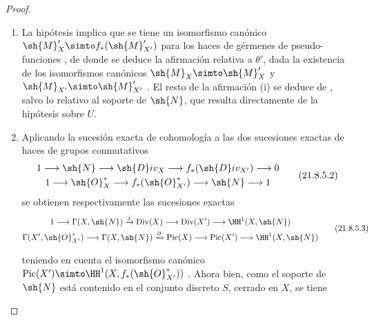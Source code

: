 \begin{proof}
\begin{enumerate}[label=(\roman*)]
  \item La hipótesis implica que se tiene un isomorfismo canónico $\sh{M}'_X\simto f_*(\sh{M}'_{X'})$ para los haces de gérmenes de pseudo-funciones , de donde se deduce la afirmación relativa a $\theta'$, dada la existencia de los isomorfismos canónicos $\sh{M}_X\simto\sh{M}'_X$ y $\sh{M}_{X'}\simto\sh{M}'_{X'}$ .
El resto de la afirmación (i) se deduce de , salvo lo relativo al soporte de $\sh{N}$, que resulta directamente de la hipótesis sobre $U$.

  \item Aplicando la sucesión exacta de cohomología a las dos sucesiones exactas de haces de grupos conmutativos
\[
\label{IV.21.8.5.2}
\begin{gathered}
  1\to\sh{N}\to\sh{D}iv_X\to f_*(\sh{D}iv_{X'})\to0\\
  1\to\sh{O}^*_X\to f_*(\sh{O}^*_{X'})\to\sh{N}\to1
\end{gathered}
  \tag{21.8.5.2}
\]
se obtienen respectivamente las sucesiones exactas
\[
\label{IV.21.8.5.3}
\begin{gathered}
  1\to\Gamma(X,\sh{N})\xrightarrow{j}\operatorname{Div}(X)\to\operatorname{Div}(X')\to\HH^1(X,\sh{N})\\
  \Gamma(X',\sh{O}^*_{X'})\to\Gamma(X,\sh{N})\xrightarrow{\partial}\operatorname{Pic}(X)\to\operatorname{Pic}(X')\to\HH^1(X,\sh{N})
\end{gathered}
  \tag{21.8.5.3}
\]

teniendo en cuenta el isomorfismo canónico $\operatorname{Pic}(X')\simto\HH^1(X,f_*(\sh{O}^*_{X'}))$ .
Ahora bien, como el soporte de $\sh{N}$ está contenido en el conjunto discreto $S$, cerrado en $X$, se tiene


\end{enumerate}
\end{proof}

